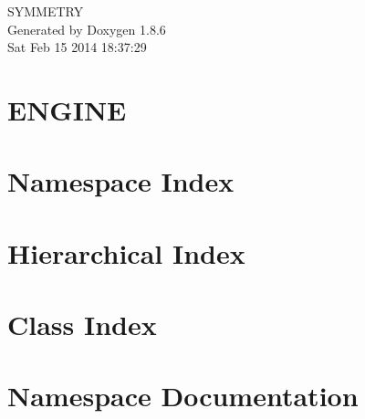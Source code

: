 \documentclass[twoside]{book}
\newcommand{\clearemptydoublepage}{%
  \newpage{\pagestyle{empty}\cleardoublepage}%
}
\begin{document}
\hypersetup{pageanchor=false}
\begin{titlepage}
\vspace*{7cm}
\begin{center}%
{\Large S\-Y\-M\-M\-E\-T\-R\-Y }\\
\vspace*{1cm}
{\large Generated by Doxygen 1.8.6}\\
\vspace*{0.5cm}
{\small Sat Feb 15 2014 18:37:29}\\
\end{center}
\end{titlepage}
\clearemptydoublepage
\tableofcontents
\clearemptydoublepage
{}
\hypersetup{pageanchor=true}

\chapter{E\-N\-G\-I\-N\-E}
\label{index}\hypertarget{index}{}
\chapter{Namespace Index}

\chapter{Hierarchical Index}

\chapter{Class Index}

\chapter{Namespace Documentation}

\end{document}
